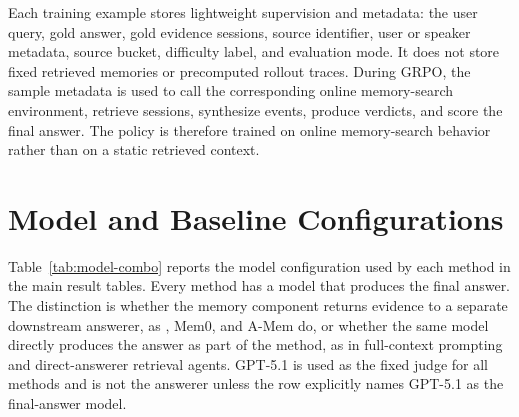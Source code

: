 \begin{table}[H]
  \centering
  \caption{Training and evaluation split used for GRPO training and reporting.}
  \label{tab:training-evaluation-split}
  \scriptsize
\end{table}

Each training example stores lightweight supervision and metadata: the user
query, gold answer, gold evidence sessions, source identifier, user or speaker
metadata, source bucket, difficulty label, and evaluation mode. It does not
store fixed retrieved memories or precomputed rollout traces. During GRPO, the
sample metadata is used to call the corresponding online memory-search
environment, retrieve sessions, synthesize events, produce verdicts, and score
the final answer. The policy is therefore trained on online memory-search
behavior rather than on a static retrieved context.

\section{Model and Baseline Configurations}
\label{app:model-combo}

Table~\ref{tab:model-combo} reports the model configuration used by each method
in the main result tables. Every method has a model that produces the final
answer. The distinction is whether the memory component returns evidence to a
separate downstream answerer, as \sys{}, Mem0, and A-Mem do, or whether the
same model directly produces the answer as part of the method, as in
full-context prompting and direct-answerer retrieval agents. GPT-5.1 is used as
the fixed judge for all methods and is not the answerer unless the row
explicitly names GPT-5.1 as the final-answer model.

